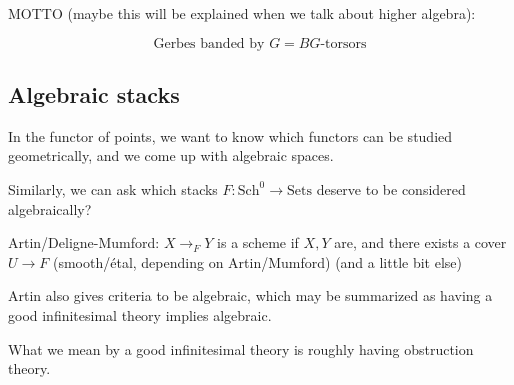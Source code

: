 \documentclass{amsart}
\theoremstyle{definition}
\begin{document}
MOTTO (maybe this will be explained when we talk about higher algebra): 

$$\text{Gerbes banded by $G$}=\text{$BG$-torsors}$$


\subsection{Algebraic stacks}
In the functor of points, we want to know which functors can be studied geometrically, and we come up with algebraic spaces.

Similarly, we can ask which stacks $F:\text{Sch}^0\to\text{Sets}$ deserve to be considered algebraically?

Artin/Deligne-Mumford: $X\to_F Y$ is a scheme if $X,Y$ are, and there exists a cover $U\to F$ (smooth/\'etal, depending on Artin/Mumford)  (and a little bit else)

Artin also gives criteria to be algebraic, which may be summarized as having a good infinitesimal theory implies algebraic.  

What we mean by a good infinitesimal theory is roughly having obstruction theory.
\end{document}

